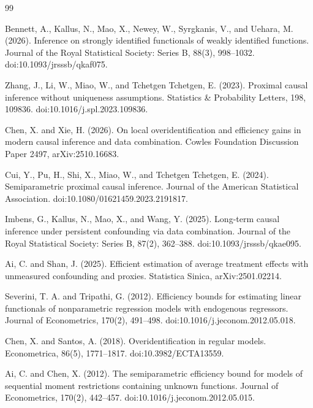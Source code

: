 \documentclass{article}
\begin{document}
\begin{thebibliography}{99}

   Bennett, A., Kallus, N., Mao, X., Newey, W., Syrgkanis, V., and Uehara, M. (2026). Inference on strongly identified functionals of weakly identified functions. Journal of the Royal Statistical Society: Series B, 88(3), 998--1032. doi:10.1093/jrsssb/qkaf075.

   Zhang, J., Li, W., Miao, W., and Tchetgen Tchetgen, E. (2023). Proximal causal inference without uniqueness assumptions. Statistics \& Probability Letters, 198, 109836. doi:10.1016/j.spl.2023.109836.

   Chen, X. and Xie, H. (2026). On local overidentification and efficiency gains in modern causal inference and data combination. Cowles Foundation Discussion Paper 2497, arXiv:2510.16683.

   Cui, Y., Pu, H., Shi, X., Miao, W., and Tchetgen Tchetgen, E. (2024). Semiparametric proximal causal inference. Journal of the American Statistical Association. doi:10.1080/01621459.2023.2191817.

   Imbens, G., Kallus, N., Mao, X., and Wang, Y. (2025). Long-term causal inference under persistent confounding via data combination. Journal of the Royal Statistical Society: Series B, 87(2), 362--388. doi:10.1093/jrsssb/qkae095.

   Ai, C. and Shan, J. (2025). Efficient estimation of average treatment effects with unmeasured confounding and proxies. Statistica Sinica, arXiv:2501.02214.

   Severini, T. A. and Tripathi, G. (2012). Efficiency bounds for estimating linear functionals of nonparametric regression models with endogenous regressors. Journal of Econometrics, 170(2), 491--498. doi:10.1016/j.jeconom.2012.05.018.

   Chen, X. and Santos, A. (2018). Overidentification in regular models. Econometrica, 86(5), 1771--1817. doi:10.3982/ECTA13559.

   Ai, C. and Chen, X. (2012). The semiparametric efficiency bound for models of sequential moment restrictions containing unknown functions. Journal of Econometrics, 170(2), 442--457. doi:10.1016/j.jeconom.2012.05.015.


\end{thebibliography}
\end{document}
